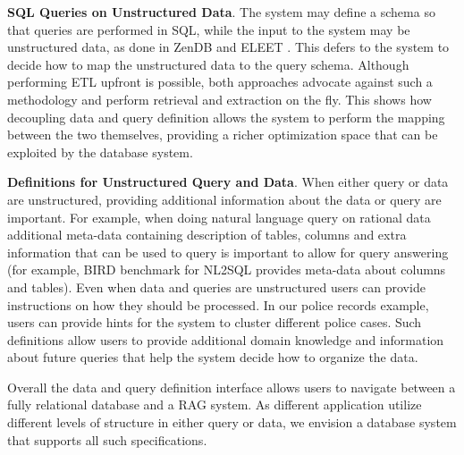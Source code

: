 \textbf{SQL Queries on Unstructured Data}. The system may define a schema so that queries are performed in SQL, while the input to the system may be unstructured data, as done in ZenDB \cite{lin2024towards} and ELEET \cite{urban2024efficient}. This defers to the system to decide how to map the unstructured data to the query schema. Although performing ETL upfront is possible, both approaches advocate against such a methodology and perform retrieval and extraction on the fly. This shows how decoupling data and query definition allows the system to perform the mapping between the two themselves, providing a richer optimization space that can be exploited by the database system.  

\textbf{Definitions for Unstructured Query and Data}. When either query or data are unstructured, providing additional information about the data or query are important. For example, when doing natural language query on rational data additional meta-data containing description of tables, columns and extra information that can be used to query is important to allow for query answering (for example, BIRD \cite{li2024can} benchmark for NL2SQL provides meta-data about columns and tables). Even when data and queries are unstructured users can provide instructions on how they should be processed. In our police records example, users can provide hints for the system to cluster different police cases. Such definitions allow users to provide additional domain knowledge and information about future queries that help the system decide how to organize the data. 


Overall the data and query definition interface allows users to navigate between a fully relational database and a RAG system. As different application utilize different levels of structure in either query or data, we envision a database system that supports all such specifications. 





